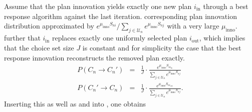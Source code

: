 Assume that the plan innovation yields exactly one new plan $i_{\text{in}}$
through a
best response algorithm
against the last iteration.
 corresponding plan innovation distribution 
approximated by $e^{\mu_{\text{inno}}S_{ni}}/\sum_{j\in
\mathcal{U}_n}e^{\mu_{\text{inno}}S_{nj}}$\corr{,}{} with a very large
$\mu_{\text{inno}}$.  further that $i_{\text{in}}$
replaces exactly one uniformly selected plan $i_{\text{out}}$, which implies
that the choice set size $J$ is constant and  for
simplicity\corr{,}{} the case that the best response innovation reconstructs the
removed plan exactly. 
\begin{eqnarray}
P(C_{n}\rightarrow C_{n}') & = & \frac{1}{J}\cdot\frac{e^{\mu_{\text{inno}}S_{ni_{\text{in}}}}}{\sum_{j\in \mathcal{U}_n}e^{\mu_{\text{inno}}S_{nj}}}\\
P(C_{n}'\rightarrow C_{n}) & = & \frac{1}{J}\cdot\frac{e^{\mu_{\text{inno}}S_{ni_{\text{out}}}}}{\sum_{j\in \mathcal{U}_n}e^{\mu_{\text{inno}}S_{nj}}}.
\end{eqnarray}
Inserting this as well as  and 
into , one obtains 
